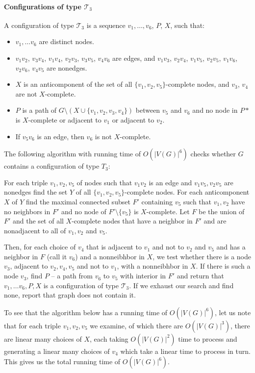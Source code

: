 \documentclass{article}
\newcommand{\TODO}{\todo[inline]}
\newcommand\T{\mathcal{T}}
\begin{document}
\paragraph{Configurations of type $\T_3$}

A configuration of type $\T_3$ is a sequence $v_1, \ldots, v_6$, $P$, $X$, such that:
\begin{itemize}
	\item $v_1, \ldots v_6$ are distinct nodes.
	\item $v_1v_2$, $v_3v_4$, $v_1v_4$, $v_2v_3$, $v_3v_5$, $v_4v_6$ are edges, and $v_1v_3$, $v_2v_4$, $v_1v_5$, $v_2v_5$, $v_1v_6$, $v_2v_6$, $v_4v_5$ are nonedges.
	\item $X$ is an anticomponent of the set of all $\{v_1, v_2, v_5\}$-complete nodes, and $v_3$, $v_4$ are not $X$-complete.
	\item $P$ is a path of $G \setminus ( X \cup \{v_1, v_2, v_3, v_4\} )$ between $v_5$ and $v_6$ and no node in $P*$ is $X$-complete or adjacent to $v_1$ or adjacent to $v_2$.
	\item If $v_5v_6$ is an edge, then $v_6$ is not $X$-complete.
\end{itemize}

\TODO{picture?}

The following algorithm with running time of $O(|V(G)|^6)$ checks whether $G$ contains a configuration of type $T_3$:

For each triple $v_1, v_2, v_5$ of nodes such that $v_1v_2$ is an edge and $v_1v_5, v_2v_5$ are nonedges find the set $Y$ of all $\{v_1, v_2, v_5\}$-complete nodes. For each anticomponent $X$ of $Y$ find the maximal connected subset $F'$ containing $v_5$ such that $v_1, v_2$ have no neighbors in $F'$ and no node of $F'\setminus\{v_5\}$ is $X$-complete. Let $F$ be the union of $F'$ and the set of all $X$-complete nodes that have a neighbor in $F'$ and are nonadjacent to all of $v_1, v_2$ and $v_5$. 

Then, for each choice of $v_4$ that is adjacent to $v_1$ and not to $v_2$ and $v_5$ and has a neighbor in $F$ (call it $v_6$) and a nonneibhbor in $X$, we test whether there is a node $v_3$, adjacent to $v_2, v_4, v_5$ and not to $v_1$, with a nonneibhbor in $X$. If there is such a node $v_3$, find $P$ -- a path from $v_6$ to $v_5$ with interior in $F'$ and return that $v_1, \ldots v_6, P, X$ is a configuration of type $\T_3$. If we exhaust our search and find none, report that graph does not contain it.

To see that the algorithm below has a running time of $O(|V(G)|^6)$, let us note that for each triple $v_1, v_2, v_5$ we examine, of which there are $O(|V(G)|^3)$, there are linear many choices of $X$, each taking $O(|V(G)|^2)$ time to process and generating a linear many choices of $v_4$ which take a linear time to process in turn. This gives us the total running time of $O(|V(G)|^6)$.
\end{document}
